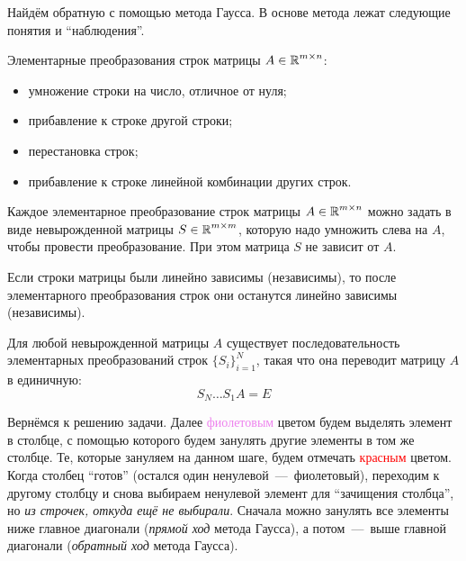 \documentclass[a4paper,12pt]{article}
\begin{document}
  \begin{solution}
    Найдём обратную с помощью метода Гаусса.
    В основе метода лежат следующие понятия и ``наблюдения''.
    
    \begin{definition}
      Элементарные преобразования строк матрицы $A \in \operatorname{\mathbb R}^{m\times n}$:
      \begin{itemize}
        \item умножение строки на число, отличное от нуля;
        \item прибавление к строке другой строки;
        \item перестановка строк;
        \item прибавление к строке линейной комбинации других строк.
      \end{itemize}
    \end{definition}
    
    \begin{remark}
      Каждое элементарное преобразование строк матрицы $A \hm\in \RR^{m\times n}$ можно задать в виде невырожденной матрицы $S \hm\in \RR^{m \times m}$, которую надо умножить слева на $A$, чтобы провести преобразование.
      При этом матрица $S$ не зависит от $A$.
    \end{remark}
    
    \begin{remark}
      Если строки матрицы были линейно зависимы (независимы), то после элементарного преобразования строк они останутся линейно зависимы (независимы).
    \end{remark}
    
    \begin{remark}
      Для любой невырожденной матрицы $A$ существует последовательность элементарных преобразований строк $\{S_i\}_{i = 1}^N$, такая что она переводит матрицу $A$ в единичную:
      \[
        S_N \ldots S_1 A = E
      \]
    \end{remark}
    
    Вернёмся к решению задачи.
    Далее \textcolor{violet}{фиолетовым} цветом будем выделять элемент в столбце, с помощью которого будем занулять другие элементы в том же столбце.
    Те, которые зануляем на данном шаге, будем отмечать \textcolor{red}{красным} цветом.
    Когда столбец ``готов'' (остался один ненулевой~---~фиолетовый), переходим к другому столбцу и снова выбираем ненулевой элемент для ``зачищения столбца'', но \emph{из строчек, откуда ещё не выбирали}.
    Сначала можно занулять все элементы ниже главное диагонали (\emph{прямой ход} метода Гаусса), а потом~---~выше главной диагонали (\emph{обратный ход} метода Гаусса).
    

\end{solution}
\end{document}
